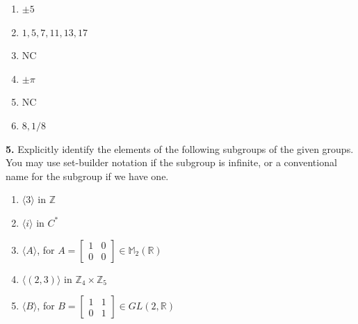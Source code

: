 \documentclass[10pt,]{book}
\theoremstyle{plain}
\theoremstyle{definition}
\theoremstyle{definition}
\theoremstyle{definition}
\theoremstyle{definition}
\numberwithin{equation}{section}
\def\Z{\mathbb{Z}}
\def\R{\mathbb{R}}
\def\M{\mathbb{M}}
\newcommand{\amp}{ & }
\begin{document}
\par\smallskip
\leavevmode%
\begin{enumerate}[label=(\alph*)]
\item\hypertarget{li-299}{}
          \(\pm 5\)
\item\hypertarget{li-300}{}
          \(1,5,7,11,13,17\)
\item\hypertarget{li-301}{}
          NC
\item\hypertarget{li-302}{}
          \(\pm \pi\)
\item\hypertarget{li-303}{}
          NC
\item\hypertarget{li-304}{}
          \(8,1/8\)
\end{enumerate}
\par\smallskip
\noindent\textbf{5.}\quad{}
        Explicitly identify the elements of the following subgroups of the given groups. You may use set-builder notation if the subgroup is infinite, or a conventional name for the subgroup if we have one.
        \leavevmode%
\begin{enumerate}[label=(\alph*)]
\item\hypertarget{li-305}{}
              \(\langle 3\rangle\) in \(\Z\)
\item\hypertarget{li-306}{}
              \(\langle i\rangle\) in \(C^*\)
\item\hypertarget{li-307}{}
              \(\langle A\rangle\), for \(A=\left[ \begin{array}{cc}
              1 \amp  0 \\
              0 \amp  0
              \end{array} 
              \right]\in \M_2(\R)\)
\item\hypertarget{li-308}{}
              \(\langle (2,3)\rangle\) in \(\Z_4\times \Z_5\)
\item\hypertarget{li-309}{}
              \(\langle B\rangle\), for \(B=\left[ \begin{array}{cc}
              1 \amp  1\\
              0 \amp  1
              \end{array} 
              \right]\in GL(2,\R)\)
\end{enumerate}
\end{document}
